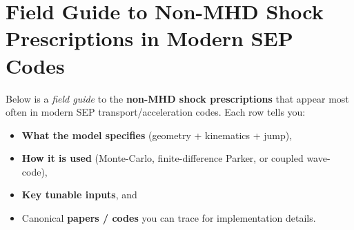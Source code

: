 \section*{Field Guide to \textbf{Non-MHD Shock Prescriptions} in Modern SEP Codes}

Below is a \textit{field guide} to the \textbf{non-MHD shock prescriptions} that appear most often in modern SEP transport/acceleration codes. Each row tells you:
\begin{itemize}
\item \textbf{What the model specifies} (geometry + kinematics + jump),
\item \textbf{How it is used} (Monte-Carlo, finite-difference Parker, or coupled wave-code),
\item \textbf{Key tunable inputs}, and
\item Canonical \textbf{papers / codes} you can trace for implementation details.
\end{itemize}

